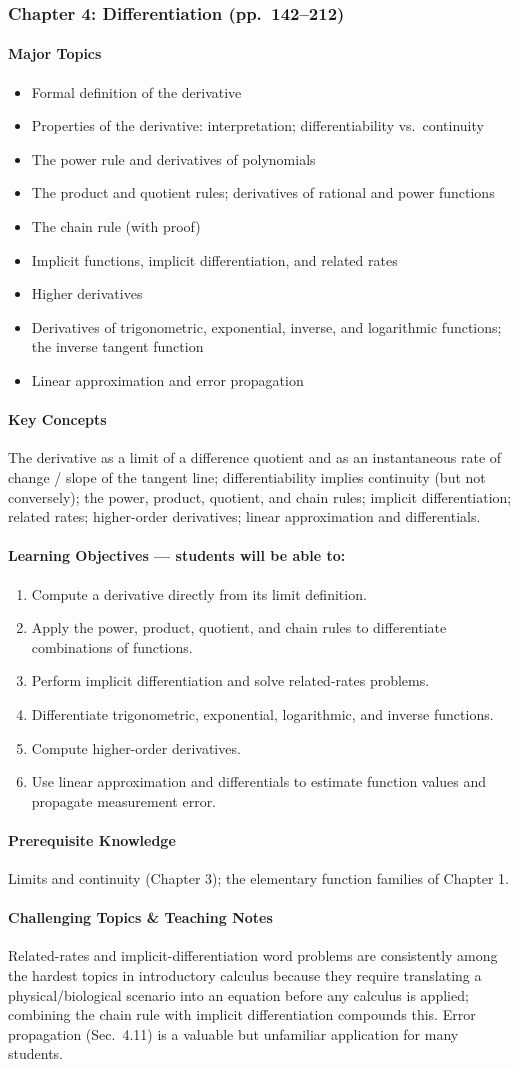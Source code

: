\documentclass[11pt]{article}
\newcommand{\ChapHead}[2]{\subsubsection{#1 \textnormal{\normalfont\normalsize\color{lightgray}(pp.\ #2)}}}
\newcommand{\MajorTopics}{\paragraph{Major Topics}}
\newcommand{\KeyConcepts}{\paragraph{Key Concepts}}
\newcommand{\LearnObj}{\paragraph{Learning Objectives --- students will be able to:}}
\newcommand{\PreReq}{\paragraph{Prerequisite Knowledge}}
\newcommand{\Hard}{\paragraph{Challenging Topics \& Teaching Notes}}
\begin{document}
\bigskip
\ChapHead{Chapter 4: Differentiation}{142--212}

\MajorTopics
\begin{itemize}
\item Formal definition of the derivative
\item Properties of the derivative: interpretation; differentiability vs.\ continuity
\item The power rule and derivatives of polynomials
\item The product and quotient rules; derivatives of rational and power functions
\item The chain rule (with proof)
\item Implicit functions, implicit differentiation, and related rates
\item Higher derivatives
\item Derivatives of trigonometric, exponential, inverse, and logarithmic functions; the inverse tangent function
\item Linear approximation and error propagation
\end{itemize}

\KeyConcepts
The derivative as a limit of a difference quotient and as an instantaneous
rate of change / slope of the tangent line; differentiability implies
continuity (but not conversely); the power, product, quotient, and chain
rules; implicit differentiation; related rates; higher-order derivatives;
linear approximation and differentials.

\LearnObj
\begin{enumerate}
\item Compute a derivative directly from its limit definition.
\item Apply the power, product, quotient, and chain rules to differentiate combinations of functions.
\item Perform implicit differentiation and solve related-rates problems.
\item Differentiate trigonometric, exponential, logarithmic, and inverse functions.
\item Compute higher-order derivatives.
\item Use linear approximation and differentials to estimate function values and propagate measurement error.
\end{enumerate}

\PreReq Limits and continuity (Chapter 3); the elementary function families of Chapter 1.

\Hard Related-rates and implicit-differentiation word problems are
consistently among the hardest topics in introductory calculus because they
require translating a physical/biological scenario into an equation before
any calculus is applied; combining the chain rule with implicit
differentiation compounds this. Error propagation (Sec.\ 4.11) is a valuable
but unfamiliar application for many students.
\end{document}

